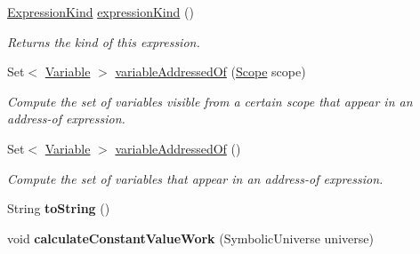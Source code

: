 \begin{DoxyCompactItemize}
\item 
\hyperlink{enumedu_1_1udel_1_1cis_1_1vsl_1_1civl_1_1model_1_1IF_1_1expression_1_1Expression_1_1ExpressionKind}{Expression\+Kind} \hyperlink{classedu_1_1udel_1_1cis_1_1vsl_1_1civl_1_1model_1_1common_1_1expression_1_1CommonArrayLiteralExpression_a7e6edc60e469a2c03a6da8a07ffa5274}{expression\+Kind} ()
\begin{DoxyCompactList}\small\item\em Returns the kind of this expression. \end{DoxyCompactList}\item 
Set$<$ \hyperlink{interfaceedu_1_1udel_1_1cis_1_1vsl_1_1civl_1_1model_1_1IF_1_1variable_1_1Variable}{Variable} $>$ \hyperlink{classedu_1_1udel_1_1cis_1_1vsl_1_1civl_1_1model_1_1common_1_1expression_1_1CommonArrayLiteralExpression_a1a19219fd572238dd29b089c063d0598}{variable\+Addressed\+Of} (\hyperlink{interfaceedu_1_1udel_1_1cis_1_1vsl_1_1civl_1_1model_1_1IF_1_1Scope}{Scope} scope)
\begin{DoxyCompactList}\small\item\em Compute the set of variables visible from a certain scope that appear in an address-\/of expression. \end{DoxyCompactList}\item 
Set$<$ \hyperlink{interfaceedu_1_1udel_1_1cis_1_1vsl_1_1civl_1_1model_1_1IF_1_1variable_1_1Variable}{Variable} $>$ \hyperlink{classedu_1_1udel_1_1cis_1_1vsl_1_1civl_1_1model_1_1common_1_1expression_1_1CommonArrayLiteralExpression_a42dca64b04c41388ac68383e4b2108d1}{variable\+Addressed\+Of} ()
\begin{DoxyCompactList}\small\item\em Compute the set of variables that appear in an address-\/of expression. \end{DoxyCompactList}\item 
\hypertarget{classedu_1_1udel_1_1cis_1_1vsl_1_1civl_1_1model_1_1common_1_1expression_1_1CommonArrayLiteralExpression_ab3b645ef72ee27383d76d90d76502702}{}String {\bfseries to\+String} ()\label{classedu_1_1udel_1_1cis_1_1vsl_1_1civl_1_1model_1_1common_1_1expression_1_1CommonArrayLiteralExpression_ab3b645ef72ee27383d76d90d76502702}

\item 
\hypertarget{classedu_1_1udel_1_1cis_1_1vsl_1_1civl_1_1model_1_1common_1_1expression_1_1CommonArrayLiteralExpression_a4c3295e24ce8c39248264e6b3e3923bf}{}void {\bfseries calculate\+Constant\+Value\+Work} (Symbolic\+Universe universe)\label{classedu_1_1udel_1_1cis_1_1vsl_1_1civl_1_1model_1_1common_1_1expression_1_1CommonArrayLiteralExpression_a4c3295e24ce8c39248264e6b3e3923bf}


\end{DoxyCompactItemize}
